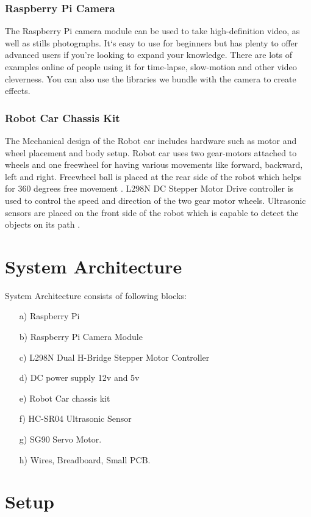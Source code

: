 \documentclass[sigconf]{acmart}
\begin{document}
\subsubsection{Raspberry Pi Camera}
The Raspberry Pi camera module can be used to take high-definition video, as well as stills photographs. It`s easy to use for beginners but has plenty to offer advanced users if you’re looking to expand your knowledge. There are lots of examples online of people using it for time-lapse, slow-motion and other video cleverness. You can also use the libraries we bundle with the camera to create effects.

\subsubsection{Robot Car Chassis Kit}
The Mechanical design of the Robot car includes hardware such as motor and wheel placement and body setup. Robot car uses two gear-motors attached to wheels and one freewheel for having various movements like forward, backward, left and right. Freewheel ball is placed at the rear side of the robot which helps for 360 degrees free movement \cite{arduino2015}. L298N DC Stepper Motor Drive controller is used to control the speed and direction of the two gear motor wheels. Ultrasonic sensors are placed on the front side of the robot which is capable to detect the objects on its path \cite{gregor2017}.



\section{System Architecture}
System Architecture consists of following blocks:

\begin{itemize}
\item[a)] Raspberry Pi
\item[b)] Raspberry Pi Camera Module
\item[c)] L298N Dual H-Bridge Stepper Motor Controller
\item[d)] DC power supply 12v and 5v
\item[e)] Robot Car chassis kit
\item[f)] HC-SR04 Ultrasonic Sensor
\item[g)] SG90 Servo Motor.
\item[h)] Wires, Breadboard, Small PCB.
\end{itemize}


\section{Setup}
\end{document}
